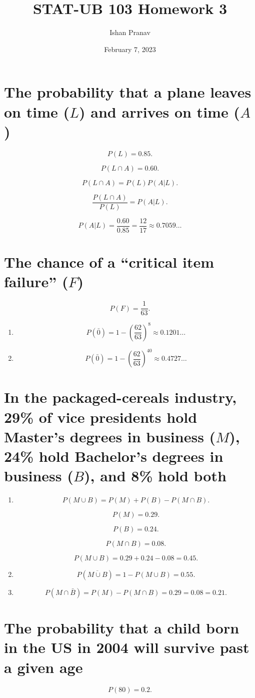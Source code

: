 \documentclass[12pt]{article}
\title{STAT-UB 103 Homework 3}
\author{Ishan Pranav}
\date{February 7, 2023}
\begin{document}
\maketitle
\section{The probability that a plane leaves on time ($L$) and arrives on time ($A$)}
\[P(L)=0.85.\]

\[P(L\cap A)=0.60.\]

\[P(L\cap A)=P(L)P(A|L).\]

\[\frac{P(L\cap A)}{P(L)}=P(A|L).\]

\[P(A|L)=\frac{0.60}{0.85}=\frac{12}{17}\approx 0.7059\dots\]
\section{The chance of a ``critical item failure'' ($F$)}
\[P(F)=\frac{1}{63}.\]
\begin{enumerate}
    \item \[P(\bar{0})=1-\left(\frac{62}{63}\right)^8\approx 0.1201\dots\]
    \item \[P(\bar{0})=1-\left(\frac{62}{63}\right)^{40}\approx 0.4727\dots\]
\end{enumerate}
\section{In the packaged-cereals industry, 29\% of vice presidents hold Master’s degrees in business ($M$), 24\% hold Bachelor’s degrees in business ($B$), and 8\% hold both}
\begin{enumerate}
\item
\[P(M\cup B)=P(M)+P(B)-P(M\cap B).\]

\[P(M)=0.29.\]

\[P(B)=0.24.\]

\[P(M\cap B)=0.08.\]

\[P(M\cup B)=0.29+0.24-0.08=0.45.\]
\item
\[P(\overline{M\cup B})=1-P(M\cup B)=0.55.\]
\item
\[P(M\cap\bar{B})=P(M)-P(M\cap B)=0.29=0.08=0.21.\]
\end{enumerate}
\section{The probability that a child born in the US in 2004 will survive past a given age}
\[P(80)=0.2.\]
\end{document}
